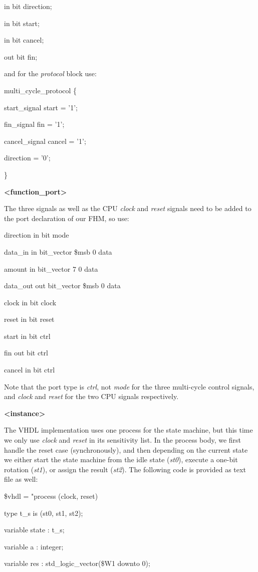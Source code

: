 \documentclass[
]{article}
\begin{document}
in bit direction;

in bit start;

in bit cancel;

out bit fin;

and for the \emph{protocol} block use:

multi\_cycle\_protocol \{

start\_signal start = '1';

fin\_signal fin = '1';

cancel\_signal cancel = '1';

direction = '0';

\}

\textbf{\textless function\_port\textgreater{}}

The three signals as well as the CPU \emph{clock} and \emph{reset}
signals need to be added to the port declaration of our FHM, so use:

direction in bit mode

data\_in in bit\_vector \$msb 0 data

amount in bit\_vector 7 0 data

data\_out out bit\_vector \$msb 0 data

clock in bit clock

reset in bit reset

start in bit ctrl

fin out bit ctrl

cancel in bit ctrl

Note that the port type is \emph{ctrl}, not \emph{mode} for the three
multi-cycle control signals, and \emph{clock} and \emph{reset} for the
two CPU signals respectively.

\textbf{\textless instance\textgreater{}}

The VHDL implementation uses one process for the state machine, but this
time we only use \emph{clock} and \emph{reset} in its sensitivity list.
In the process body, we first handle the reset case (synchronously), and
then depending on the current state we either start the state machine
from the idle state (\emph{st0}), execute a one-bit rotation
(\emph{st1}), or assign the result (\emph{st2}). The following code is
provided as text file as well:

\$vhdl = "process (clock, reset)

type t\_s is (st0, st1, st2);

variable state : t\_s;

variable a : integer;

variable res : std\_logic\_vector(\$W1 downto 0);
\end{document}
